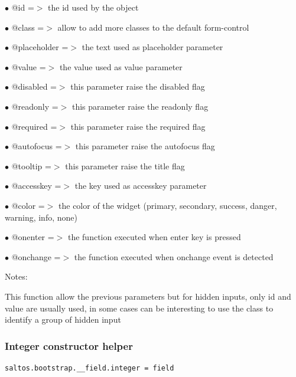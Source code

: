\documentclass[a4paper]{article}
\begin{document}
\begin{compactitem}
\item[\color{myblue}$\bullet$] @id          =$>$ the id used by the object
\item[\color{myblue}$\bullet$] @class       =$>$ allow to add more classes to the default form-control
\item[\color{myblue}$\bullet$] @placeholder =$>$ the text used as placeholder parameter
\item[\color{myblue}$\bullet$] @value       =$>$ the value used as value parameter
\item[\color{myblue}$\bullet$] @disabled    =$>$ this parameter raise the disabled flag
\item[\color{myblue}$\bullet$] @readonly    =$>$ this parameter raise the readonly flag
\item[\color{myblue}$\bullet$] @required    =$>$ this parameter raise the required flag
\item[\color{myblue}$\bullet$] @autofocus   =$>$ this parameter raise the autofocus flag
\item[\color{myblue}$\bullet$] @tooltip     =$>$ this parameter raise the title flag
\item[\color{myblue}$\bullet$] @accesskey   =$>$ the key used as accesskey parameter
\item[\color{myblue}$\bullet$] @color       =$>$ the color of the widget (primary, secondary, success, danger, warning, info, none)
\item[\color{myblue}$\bullet$] @onenter     =$>$ the function executed when enter key is pressed
\item[\color{myblue}$\bullet$] @onchange    =$>$ the function executed when onchange event is detected
\end{compactitem}

Notes:

This function allow the previous parameters but for hidden inputs, only id
and value are usually used, in some cases can be interesting to use the
class to identify a group of hidden input

\hypertarget{toc52}{}
\subsubsection{Integer constructor helper}

\begin{lstlisting}
saltos.bootstrap.__field.integer = field
\end{lstlisting}
\end{document}
